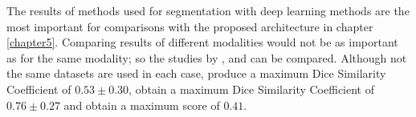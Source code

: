 The results of methods used for segmentation with deep learning methods are the most important for comparisons with the proposed architecture in chapter \ref{chapter5}. Comparing results of different modalities would not be as important as for the same modality; so the studies by \citeauthor{Yang2020}, \citeauthor{Sichermann2019} and  can be compared. Although not the same datasets are used in each case, \citeauthor{Sichermann2019} produce a maximum Dice Similarity Coefficient of $0.53 \pm 0.30$, \citeauthor{Yang2020} obtain a maximum Dice Similarity Coefficient of $0.76 \pm 0.27$ and  obtain a maximum score of $0.41$. 








